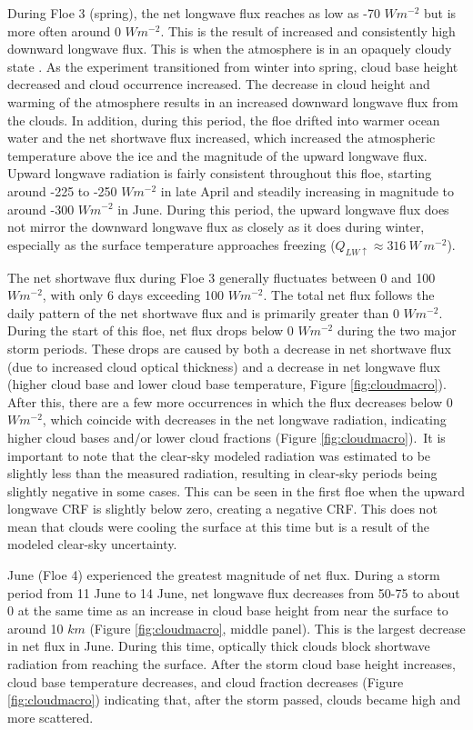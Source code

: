 During Floe 3 (spring), the net longwave flux reaches as low as -70 $Wm^{-2}$ but is more often around 0 $Wm^{-2}$. This is the result of increased and consistently high downward longwave flux. This is when the atmosphere is in an opaquely cloudy state \citep{stramler:2011, graham:2017:comp}. As the experiment transitioned from winter into spring, cloud base height decreased and cloud occurrence increased. The decrease in cloud height and warming of the atmosphere results in an increased downward longwave flux from the clouds. In addition, during this period, the floe drifted into warmer ocean water \citep{kayser:2017} and the net shortwave flux increased, which increased the atmospheric temperature above the ice and the magnitude of the upward longwave flux. Upward longwave radiation is fairly consistent throughout this floe, starting around -225 to -250 $Wm^{-2}$ in late April and steadily increasing in magnitude to around -300 $Wm^{-2}$ in June. During this period, the upward longwave flux does not mirror the downward longwave flux as closely as it does during winter, especially as the surface temperature approaches freezing ($Q_{LW\uparrow} \approx 316~W~m^{-2}$).

The net shortwave flux during Floe 3 generally fluctuates between 0 and 100 $Wm^{-2}$, with only 6 days exceeding 100 $Wm^{-2}$. The total net flux follows the daily pattern of the net shortwave flux and is primarily greater than 0 $Wm^{-2}$. During the start of this floe, net flux drops below 0 $Wm^{-2}$ during the two major storm periods. These drops are caused by both a decrease in net shortwave flux (due to increased cloud optical thickness) and a decrease in net longwave flux (higher cloud base and lower cloud base temperature, Figure \ref{fig:cloudmacro}). After this, there are a few more occurrences in which the flux decreases below 0 $Wm^{-2}$, which coincide with decreases in the net longwave radiation, indicating higher cloud bases and/or lower cloud fractions (Figure \ref{fig:cloudmacro}). It is important to note that the clear-sky modeled radiation was estimated to be slightly less than the measured radiation, resulting in clear-sky periods being slightly negative in some cases. This can be seen in the first floe when the upward longwave CRF is slightly below zero, creating a negative CRF. This does not mean that clouds were cooling the surface at this time but is a result of the modeled clear-sky uncertainty. 

June (Floe 4) experienced the greatest magnitude of net flux. During a storm period from 11 June to 14 June, net longwave flux decreases from 50-75 to about 0 at the same time as an increase in cloud base height from near the surface to around 10 $km$ (Figure \ref{fig:cloudmacro}, middle panel). This is the largest decrease in net flux in June. During this time, optically thick clouds block shortwave radiation from reaching the surface. After the storm cloud base height increases, cloud base temperature decreases, and cloud fraction decreases (Figure \ref{fig:cloudmacro}) indicating that, after the storm passed, clouds became high and more scattered. 

